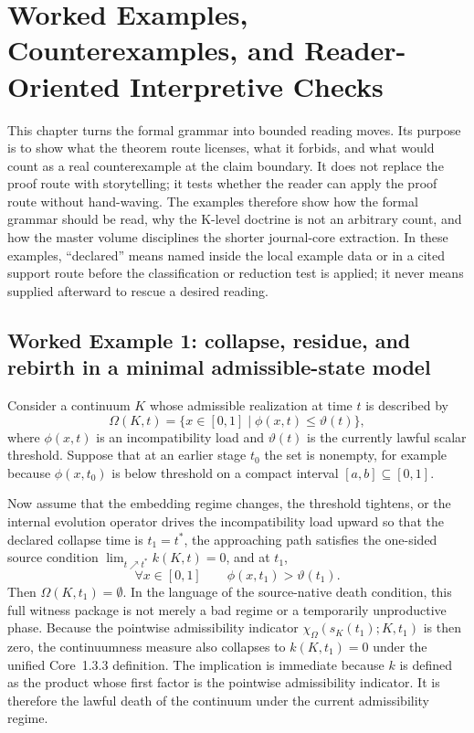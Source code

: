 \section{Worked Examples, Counterexamples, and Reader-Oriented Interpretive Checks}
\label{sec:oc13-worked-examples}

This chapter turns the formal grammar into bounded reading moves. Its purpose
is to show what the theorem route licenses, what it forbids, and what would
count as a real counterexample at the claim boundary. It does not replace the
proof route with storytelling; it tests whether the reader can apply the proof
route without hand-waving. The examples therefore show how the formal grammar
should be read, why the K-level doctrine is not an arbitrary count, and how the
master volume disciplines the shorter journal-core extraction.
In these examples, ``declared'' means named inside the local example data or in
a cited support route before the classification or reduction test is applied;
it never means supplied afterward to rescue a desired reading.

\subsection{Worked Example 1: collapse, residue, and rebirth in a minimal admissible-state model}

Consider a continuum \(K\) whose admissible realization at time \(t\) is described by
\[
\Omega(K,t) = \{x \in [0,1] \mid \phi(x,t) \le \vartheta(t)\},
\]
where \(\phi(x,t)\) is an incompatibility load and \(\vartheta(t)\) is the currently lawful scalar
threshold. Suppose that at an earlier stage \(t_0\) the set is nonempty, for example because
\(\phi(x,t_0)\) is below threshold on a compact interval \([a,b]\subseteq [0,1]\).

Now assume that the embedding regime changes, the threshold tightens, or the internal evolution
operator drives the incompatibility load upward so that the declared collapse time is
\(t_1=t^\ast\), the approaching path satisfies the one-sided source condition
\(\lim_{t\nearrow t^\ast} k(K,t)=0\), and at \(t_1\),
\[
\forall x \in [0,1] \qquad \phi(x,t_1) > \vartheta(t_1).
\]
Then \(\Omega(K,t_1)=\emptyset\). In the language of the source-native death condition, this full
witness package is
not merely a bad regime or a temporarily unproductive phase. Because the
pointwise admissibility indicator \(\chi_{\Omega}(s_K(t_1);K,t_1)\) is then zero, the
continuumness measure also collapses to \(k(K,t_1)=0\) under the unified
Core~1.3.3 definition. The implication is immediate because \(k\) is defined as
the product whose first factor is the pointwise admissibility indicator. It is therefore
the lawful death of the continuum under the current admissibility regime.

